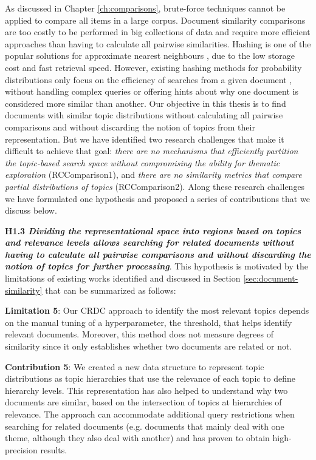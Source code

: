 As discussed in Chapter \ref{ch:comparisons}, brute-force techniques cannot be applied to compare all items in a large corpus. Document similarity comparisons are too costly to be performed in big collections of data and require more efficient approaches than having to calculate all pairwise similarities. Hashing is one of the popular solutions for approximate nearest neighbours \citep{Zhen2016}, due to the low storage cost and fast retrieval speed. However, existing hashing methods for probability distributions only focus on the efficiency of searches from a given document \citep{Mao2017}, without handling complex queries or offering hints about why one document is considered more similar than another. Our objective in this thesis is to find documents with similar topic distributions without calculating all pairwise comparisons and without discarding the notion of topics from their representation. But we have identified two research challenges that make it difficult to achieve that goal: \textit{there are no mechanisms that efficiently partition the topic-based search space without compromising the ability for thematic exploration} (RCComparison1), and \textit{there are no similarity metrics that compare partial distributions of topics} (RCComparison2). Along these research challenges we have formulated one hypothesis and proposed a series of contributions that we discuss below.

\textbf{H1.3 \textit{Dividing the representational space into regions based on topics and relevance levels allows searching for related documents without having to calculate all pairwise comparisons and without discarding the notion of topics for further processing}}. This hypothesis is motivated by the limitations of existing works identified and discussed in Section \ref{sec:document-similarity} that can be summarized as follows:


\textbf{Limitation 5}: Our CRDC approach to identify the most relevant topics depends on the manual tuning of a hyperparameter, the threshold, that helps identify relevant documents. Moreover, this method does not measure degrees of similarity since it only establishes whether two documents are related or not. 

\textbf{Contribution 5}: We created a new data structure to represent topic distributions as topic hierarchies that use the relevance of each topic to define hierarchy levels. This representation has also helped to understand why two documents are similar, based on the intersection of topics at hierarchies of relevance. The approach can accommodate additional query restrictions when searching for related documents (e.g. documents that mainly deal with one theme, although they also deal with another) and has proven to obtain high-precision results. 

